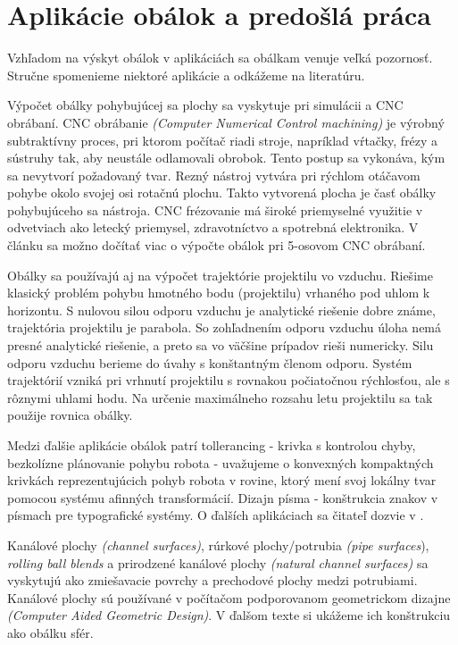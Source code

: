 \section{Aplikácie obálok a predošlá práca}
Vzhľadom na výskyt obálok v aplikáciách sa obálkam venuje veľká pozornosť. Stručne spomenieme niektoré aplikácie a odkážeme na literatúru. 

Výpočet obálky pohybujúcej sa plochy sa vyskytuje pri simulácii a CNC obrábaní. CNC obrábanie \textit{(Computer Numerical Control machining)}  je výrobný subtraktívny proces, pri ktorom počítač riadi stroje, napríklad vŕtačky, frézy a sústruhy tak, aby neustále odlamovali obrobok. Tento postup sa vykonáva, kým sa nevytvorí požadovaný tvar. Rezný nástroj vytvára pri rýchlom otáčavom pohybe okolo svojej osi rotačnú plochu. Takto vytvorená plocha je časť obálky pohybujúceho sa nástroja. CNC frézovanie má široké priemyselné využitie v odvetviach ako letecký priemysel, zdravotníctvo a spotrebná elektronika. V článku \cite{Skop20} sa možno dočítať viac o výpočte obálok pri 5-osovom CNC obrábaní.  

Obálky sa používajú aj na výpočet trajektórie projektilu vo vzduchu. Riešime klasický problém pohybu hmotného bodu (projektilu) vrhaného pod uhlom k horizontu. S nulovou silou odporu vzduchu je analytické riešenie dobre známe, trajektória projektilu je parabola. So zohľadnením odporu vzduchu úloha nemá presné analytické riešenie, a preto sa vo väčšine prípadov rieši numericky. Silu odporu vzduchu berieme do úvahy s konštantným členom odporu. Systém trajektórií vzniká pri vrhnutí projektilu s rovnakou počiatočnou rýchlosťou, ale s rôznymi uhlami hodu. Na určenie maximálneho rozsahu letu projektilu sa tak použije rovnica obálky. \cite{Chud09}

Medzi ďalšie aplikácie obálok patrí tollerancing - krivka s kontrolou chyby, bezkolízne plánovanie pohybu robota - uvažujeme o konvexných kompaktných krivkách reprezentujúcich pohyb robota v rovine, ktorý mení svoj lokálny tvar pomocou systému afinných transformácií. Dizajn písma - konštrukcia znakov v písmach pre typografické systémy. O ďalších aplikáciach sa čitateľ dozvie v \cite{Pott09}.

Kanálové plochy \textit{(channel surfaces)}, rúrkové plochy/potrubia \textit{(pipe surfaces}), \textit{rolling ball blends} a prirodzené kanálové plochy \textit{(natural channel surfaces)} sa vyskytujú ako zmiešavacie povrchy a prechodové plochy medzi potrubiami. Kanálové plochy sú používané v počítačom podporovanom geometrickom dizajne \textit{(Computer Aided Geometric Design)}. V ďalšom texte si ukážeme ich konštrukciu ako obálku sfér.

